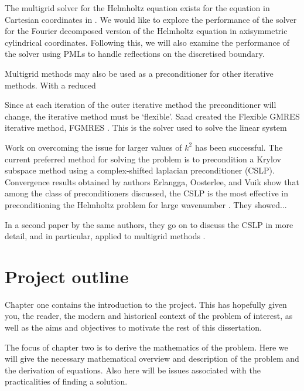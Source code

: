 The multigrid solver for the Helmholtz equation exists for the equation in Cartesian coordinates in \oomph.
We would like to explore the performance of the solver for the Fourier decomposed version of the Helmholtz equation in axisymmetric cylindrical coordinates.
Following this, we will also examine the performance of the solver using PMLs to handle reflections on the discretised boundary.


Multigrid methods may also be used as a preconditioner for other iterative methods.
With a reduced

Since at each iteration of the outer iterative method the preconditioner will change, the iterative method must be `flexible'.
Saad created the Flexible GMRES iterative method, FGMRES \cite{fgmres}.
This is the solver used to solve the linear system 


Work on overcoming the issue for larger values of $k^2$ has been successful.
The current preferred method for solving the problem is to precondition a Krylov subspace method using a complex-shifted laplacian preconditioner (CSLP).
Convergence results obtained by authors Erlangga, Oosterlee, and Vuik show that among the class of preconditioners discussed, the CSLP is the most effective in preconditioning the Helmholtz problem for large wavenumber \cite{cslp1}.
They showed... %

In a second paper by the same authors, they go on to discuss the CSLP in more detail, and in particular, applied to multigrid methods \cite{cslp2}.










\section{Project outline}

Chapter one contains the introduction to the project.
This has hopefully given you, the reader, the modern and historical context of the problem of interest, as well as the aims and objectives to motivate the rest of this dissertation.

The focus of chapter two is to derive the mathematics of the problem.
Here we will give the necessary mathematical overview and description of the problem and the derivation of equations.
Also here will be issues associated with the practicalities of finding a solution.

